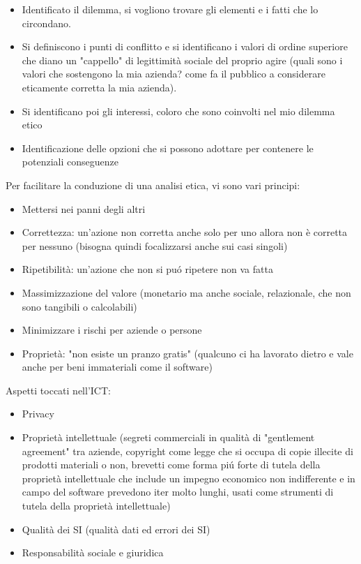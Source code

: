 \begin{itemize}

\item
  Identificato il dilemma, si vogliono trovare gli elementi e i fatti
  che lo circondano.\\
\item
  Si definiscono i punti di conflitto e si identificano i valori di
  ordine superiore che diano un "cappello" di legittimit\`a sociale del
  proprio agire (quali sono i valori che sostengono la mia azienda? come
  fa il pubblico a considerare eticamente corretta la mia azienda).\\
\item
  Si identificano poi gli interessi, coloro che sono coinvolti nel mio
  dilemma etico\\
\item
  Identificazione delle opzioni che si possono adottare per contenere le
  potenziali conseguenze
\end{itemize}

Per facilitare la conduzione di una analisi etica, vi sono vari
principi:

\begin{itemize}

\item
  Mettersi nei panni degli altri
\item
  Correttezza: un'azione non corretta anche solo per uno allora non \`e
  corretta per nessuno (bisogna quindi focalizzarsi anche sui casi
  singoli)
\item
  Ripetibilit\`a: un'azione che non si pu\'o ripetere non va fatta
\item
  Massimizzazione del valore (monetario ma anche sociale, relazionale,
  che non sono tangibili o calcolabili)
\item
  Minimizzare i rischi per aziende o persone
\item
  Propriet\`a: "non esiste un pranzo gratis" (qualcuno ci ha lavorato
  dietro e vale anche per beni immateriali come il software)
\end{itemize}

Aspetti toccati nell'ICT:

\begin{itemize}

\item
  Privacy
\item
  Propriet\`a intellettuale (segreti commerciali in qualit\`a di
  "gentlement agreement" tra aziende, copyright come legge che si
  occupa di copie illecite di prodotti materiali o non, brevetti come
  forma pi\'u forte di tutela della propriet\`a intellettuale che include un
  impegno economico non indifferente e in campo del software prevedono
  iter molto lunghi, usati come strumenti di tutela della propriet\`a
  intellettuale)
\item
  Qualit\`a dei SI (qualit\`a dati ed errori dei SI)
\item
  Responsabilit\`a sociale e giuridica
\end{itemize}

